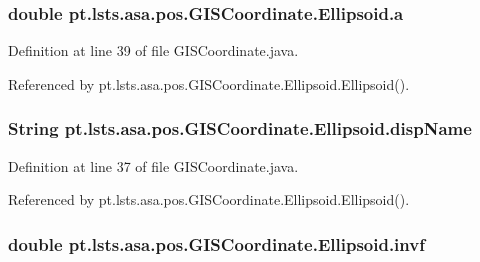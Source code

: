 \subsubsection[{a}]{\setlength{\rightskip}{0pt plus 5cm}double pt.\+lsts.\+asa.\+pos.\+G\+I\+S\+Coordinate.\+Ellipsoid.\+a}\label{classpt_1_1lsts_1_1asa_1_1pos_1_1GISCoordinate_1_1Ellipsoid_aaaec46426b01cb056a3feb1ee32b54a6}


Definition at line 39 of file G\+I\+S\+Coordinate.\+java.



Referenced by pt.\+lsts.\+asa.\+pos.\+G\+I\+S\+Coordinate.\+Ellipsoid.\+Ellipsoid().

\hypertarget{classpt_1_1lsts_1_1asa_1_1pos_1_1GISCoordinate_1_1Ellipsoid_a9761003ee693f1303d7ce10babdfb21d}{}
\subsubsection[{disp\+Name}]{\setlength{\rightskip}{0pt plus 5cm}String pt.\+lsts.\+asa.\+pos.\+G\+I\+S\+Coordinate.\+Ellipsoid.\+disp\+Name}\label{classpt_1_1lsts_1_1asa_1_1pos_1_1GISCoordinate_1_1Ellipsoid_a9761003ee693f1303d7ce10babdfb21d}


Definition at line 37 of file G\+I\+S\+Coordinate.\+java.



Referenced by pt.\+lsts.\+asa.\+pos.\+G\+I\+S\+Coordinate.\+Ellipsoid.\+Ellipsoid().

\hypertarget{classpt_1_1lsts_1_1asa_1_1pos_1_1GISCoordinate_1_1Ellipsoid_ad93c80547246333dbad9dcc44804a8f7}{}
\subsubsection[{invf}]{\setlength{\rightskip}{0pt plus 5cm}double pt.\+lsts.\+asa.\+pos.\+G\+I\+S\+Coordinate.\+Ellipsoid.\+invf}\label{classpt_1_1lsts_1_1asa_1_1pos_1_1GISCoordinate_1_1Ellipsoid_ad93c80547246333dbad9dcc44804a8f7}


